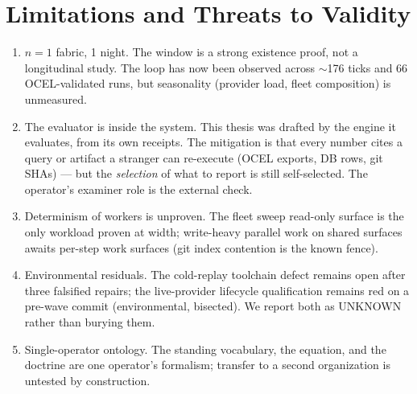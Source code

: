 \documentclass[11pt,a4paper]{article}
\theoremstyle{remark}
\begin{document}
\section{Limitations and Threats to Validity}
\begin{enumerate}
\item $n = 1$ fabric, 1 night. The window is a strong existence proof, not a longitudinal study. The loop has now been observed across $\sim$176 ticks and 66 OCEL-validated runs, but seasonality (provider load, fleet composition) is unmeasured.
\item The evaluator is inside the system. This thesis was drafted by the engine it evaluates, from its own receipts. The mitigation is that every number cites a query or artifact a stranger can re-execute (OCEL exports, DB rows, git SHAs) --- but the \emph{selection} of what to report is still self-selected. The operator's examiner role is the external check.
\item Determinism of workers is unproven. The fleet sweep read-only surface is the only workload proven at width; write-heavy parallel work on shared surfaces awaits per-step work surfaces (git index contention is the known fence).
\item Environmental residuals. The cold-replay toolchain defect remains open after three falsified repairs; the live-provider lifecycle qualification remains red on a pre-wave commit (environmental, bisected). We report both as UNKNOWN rather than burying them.
\item Single-operator ontology. The standing vocabulary, the equation, and the doctrine are one operator's formalism; transfer to a second organization is untested by construction.
\end{enumerate}
\end{document}
